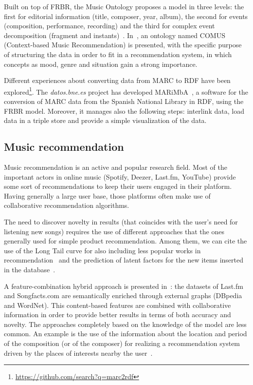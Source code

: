 \documentclass{llncs}
\begin{document}
Built on top of FRBR, the Music Ontology proposes a model in three levels: the first for editorial information (title, composer, year, album), the second for events (composition, performance, recording) and the third for complex event decomposition (fragment and instants)~\cite{raimond2007music}. In~\cite{song2009music}, an ontology named COMUS (Context-based Music Recommendation) is presented, with the specific purpose of structuring the data in order to fit in a recommendation system, in which concepts as mood, genre and situation gain a strong importance.

Different experiences about converting data from MARC to RDF have been explored\footnote{\url{https://github.com/search?q=marc2rdf}}. The \textit{datos.bne.es} project has developed MARiMbA~\cite{greenberg2013datos}, a software for the conversion of MARC data from the Spanish National Library in RDF, using the FRBR model. Moreover, it manages also the following steps: interlink data, load data in a triple store and provide a simple visualization of the data.

\subsection{Music recommendation}
Music recommendation is an active and popular research field. Most of the important actors in online music (Spotify, Deezer, Last.fm, YouTube) provide some sort of recommendations to keep their users engaged in their platform. Having generally a large user base, those platforms often make use of collaborative recommendation algorithms.

The need to discover novelty in results (that coincides with the user's need for listening new songs) requires the use of different approaches that the ones generally used for simple product recommendation. Among them, we can cite the use of the Long Tail curve for also including less popular works in recommendation~\cite{celma2009music} and the prediction of latent factors for the new items inserted in the database~\cite{van2013deep}.

A feature-combination hybrid approach is presented in~\cite{ostuni2015soundrec}: the datasets of Last.fm and Songfacts.com are semantically enriched through external graphs (DBpedia and WordNet). This content-based features are combined with collaborative information in order to provide better results in terms of both accuracy and novelty. The approaches completely based on the knowledge of the model are less common. An example is the use of the information about the location and period of the composition (or of the composer) for realizing a recommendation system driven by the places of interests nearby the user~\cite{kaminskas2012knowledge}.
\end{document}
